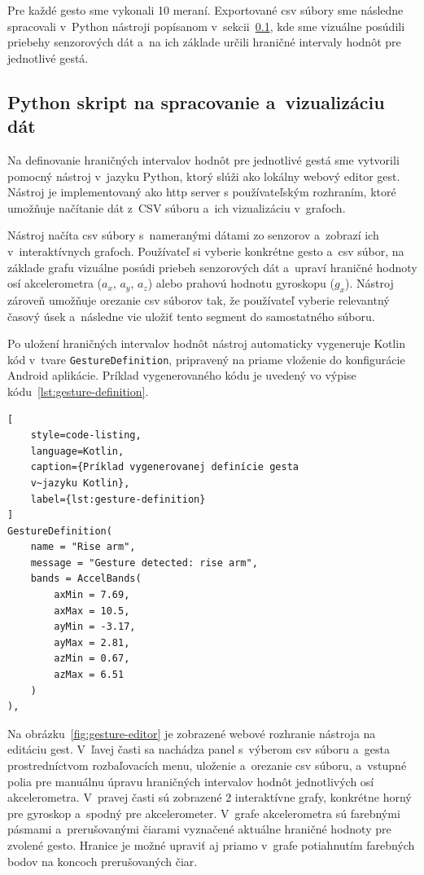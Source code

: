 Pre každé gesto sme vykonali 10 meraní. Exportované
\Gls{csv} súbory sme následne spracovali v~Python
nástroji popísanom v~sekcii~\ref{sec:python-skript},
kde sme vizuálne posúdili priebehy senzorových dát
a~na ich základe určili hraničné intervaly hodnôt pre
jednotlivé gestá.

\subsection{Python skript na spracovanie a~vizualizáciu dát}
\label{sec:python-skript}
Na definovanie hraničných intervalov hodnôt pre jednotlivé gestá
sme vytvorili pomocný nástroj v~jazyku Python, ktorý
slúži ako lokálny webový editor gest. Nástroj je
implementovaný ako \Gls{http} server s používateľským rozhraním,
ktoré umožňuje načítanie dát z~CSV súboru a~ich vizualizáciu v~grafoch.

Nástroj načíta \Gls{csv} súbory s~nameranými dátami
zo senzorov a~zobrazí ich v~interaktívnych grafoch.
Používateľ si vyberie konkrétne gesto a~\Gls{csv}
súbor, na základe grafu vizuálne posúdi priebeh
senzorových dát a~upraví hraničné hodnoty osí
akcelerometra ($a_x$, $a_y$, $a_z$) alebo prahovú
hodnotu gyroskopu ($g_x$). Nástroj zároveň umožňuje
orezanie \Gls{csv} súborov tak, že používateľ vyberie
relevantný časový úsek a~následne vie uložiť tento segment
do samostatného súboru.

Po uložení hraničných intervalov hodnôt nástroj automaticky
vygeneruje Kotlin kód v~tvare \texttt{GestureDefinition},
pripravený na priame vloženie do konfigurácie
Android aplikácie. Príklad vygenerovaného kódu je
uvedený vo výpise kódu~\ref{lst:gesture-definition}.

\begin{lstlisting}[
    style=code-listing,
    language=Kotlin,
    caption={Príklad vygenerovanej definície gesta
    v~jazyku Kotlin},
    label={lst:gesture-definition}
]
GestureDefinition(
    name = "Rise arm",
    message = "Gesture detected: rise arm",
    bands = AccelBands(
        axMin = 7.69,
        axMax = 10.5,
        ayMin = -3.17,
        ayMax = 2.81,
        azMin = 0.67,
        azMax = 6.51
    )
),
\end{lstlisting}

Na obrázku~\ref{fig:gesture-editor} je zobrazené webové rozhranie nástroja na editáciu gest. V~ľavej
časti sa nachádza panel s~výberom \Gls{csv} súboru
a~gesta prostredníctvom rozbaľovacích menu, uloženie
a~orezanie \Gls{csv} súboru, a~vstupné polia pre
manuálnu úpravu hraničných intervalov hodnôt jednotlivých osí
akcelerometra. V~pravej časti sú zobrazené 2 interaktívne
grafy, konkrétne horný pre gyroskop a~spodný pre akcelerometer.
V~grafe akcelerometra sú farebnými pásmami
a~prerušovanými čiarami vyznačené aktuálne hraničné
hodnoty pre zvolené gesto. Hranice je možné upraviť
aj priamo v~grafe potiahnutím farebných bodov na
koncoch prerušovaných čiar.

